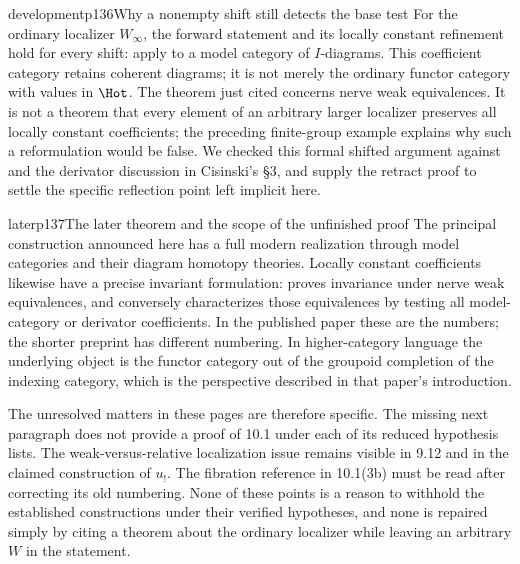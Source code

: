 \begin{dcomment}{development}{p136}{Why a nonempty shift still detects the base test}
For the ordinary localizer $W_\infty$, the forward statement and its locally constant refinement hold for every shift: apply \citet[Theorem 1.3]{Cisinski2009LocallyConstant} to a model category of $I$-diagrams. This coefficient category retains coherent diagrams; it is not merely the ordinary functor category with values in $\Hot$. The theorem just cited concerns nerve weak equivalences. It is not a theorem that every element of an arbitrary larger localizer preserves all locally constant coefficients; the preceding finite-group example explains why such a reformulation would be false. We checked this formal shifted argument against \citet[Theorem 1.25]{Groth2013} and the derivator discussion in Cisinski's \S3, and supply the retract proof to settle the specific reflection point left implicit here.
\end{dcomment}

\begin{dcomment}{later}{p137}{The later theorem and the scope of the unfinished proof}
The principal construction announced here has a full modern realization through model categories and their diagram homotopy theories. Locally constant coefficients likewise have a precise invariant formulation: \citet[Theorem 1.3 and Corollaries 1.28 and 3.8]{Cisinski2009LocallyConstant} proves invariance under nerve weak equivalences, and conversely characterizes those equivalences by testing all model-category or derivator coefficients. In the published paper these are the numbers; the shorter preprint has different numbering. In higher-category language the underlying object is the functor category out of the groupoid completion of the indexing category, which is the perspective described in that paper's introduction.

The unresolved matters in these pages are therefore specific. The missing next paragraph does not provide a proof of 10.1 under each of its reduced hypothesis lists. The weak-versus-relative localization issue remains visible in 9.12 and in the claimed construction of $u_!$. The fibration reference in 10.1(3b) must be read after correcting its old numbering. None of these points is a reason to withhold the established constructions under their verified hypotheses, and none is repaired simply by citing a theorem about the ordinary localizer while leaving an arbitrary $W$ in the statement.
\end{dcomment}
